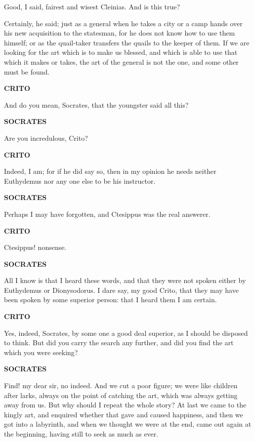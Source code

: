 \documentclass[11pt,letter]{article}
\begin{document}
\par  Good, I said, fairest and wisest Cleinias. And is this true?

\par  Certainly, he said; just as a general when he takes a city or a camp hands over his new acquisition to the statesman, for he does not know how to use them himself; or as the quail-taker transfers the quails to the keeper of them. If we are looking for the art which is to make us blessed, and which is able to use that which it makes or takes, the art of the general is not the one, and some other must be found.

\par \textbf{CRITO}
\par   And do you mean, Socrates, that the youngster said all this?

\par \textbf{SOCRATES}
\par   Are you incredulous, Crito?

\par \textbf{CRITO}
\par   Indeed, I am; for if he did say so, then in my opinion he needs neither Euthydemus nor any one else to be his instructor.

\par \textbf{SOCRATES}
\par   Perhaps I may have forgotten, and Ctesippus was the real answerer.

\par \textbf{CRITO}
\par   Ctesippus! nonsense.

\par \textbf{SOCRATES}
\par   All I know is that I heard these words, and that they were not spoken either by Euthydemus or Dionysodorus. I dare say, my good Crito, that they may have been spoken by some superior person:  that I heard them I am certain.

\par \textbf{CRITO}
\par   Yes, indeed, Socrates, by some one a good deal superior, as I should be disposed to think. But did you carry the search any further, and did you find the art which you were seeking?

\par \textbf{SOCRATES}
\par   Find! my dear sir, no indeed. And we cut a poor figure; we were like children after larks, always on the point of catching the art, which was always getting away from us. But why should I repeat the whole story? At last we came to the kingly art, and enquired whether that gave and caused happiness, and then we got into a labyrinth, and when we thought we were at the end, came out again at the beginning, having still to seek as much as ever.
\end{document}
